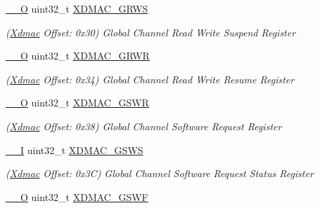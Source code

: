 \begin{DoxyCompactItemize}
\mbox{\hyperlink{core__cm7_8h_a7e25d9380f9ef903923964322e71f2f6}{\+\_\+\+\_\+O}} uint32\+\_\+t \mbox{\hyperlink{structXdmac_a5b9b148fbd65ee66068ffaac98f4cdfe}{X\+D\+M\+A\+C\+\_\+\+G\+R\+WS}}
\begin{DoxyCompactList}\small\item\em (\mbox{\hyperlink{structXdmac}{Xdmac}} Offset\+: 0x30) Global Channel Read Write Suspend Register \end{DoxyCompactList}\item 
\mbox{\label{structXdmac_ad80503154b04a9b85fa9e01dd39a9ffa}} 
\mbox{\hyperlink{core__cm7_8h_a7e25d9380f9ef903923964322e71f2f6}{\+\_\+\+\_\+O}} uint32\+\_\+t \mbox{\hyperlink{structXdmac_ad80503154b04a9b85fa9e01dd39a9ffa}{X\+D\+M\+A\+C\+\_\+\+G\+R\+WR}}
\begin{DoxyCompactList}\small\item\em (\mbox{\hyperlink{structXdmac}{Xdmac}} Offset\+: 0x34) Global Channel Read Write Resume Register \end{DoxyCompactList}\item 
\mbox{\label{structXdmac_ac0d8e32b993ed718d8e3374680318f3c}} 
\mbox{\hyperlink{core__cm7_8h_a7e25d9380f9ef903923964322e71f2f6}{\+\_\+\+\_\+O}} uint32\+\_\+t \mbox{\hyperlink{structXdmac_ac0d8e32b993ed718d8e3374680318f3c}{X\+D\+M\+A\+C\+\_\+\+G\+S\+WR}}
\begin{DoxyCompactList}\small\item\em (\mbox{\hyperlink{structXdmac}{Xdmac}} Offset\+: 0x38) Global Channel Software Request Register \end{DoxyCompactList}\item 
\mbox{\label{structXdmac_a367067a338bcf0b70ab601b93ac65810}} 
\mbox{\hyperlink{core__cm7_8h_af63697ed9952cc71e1225efe205f6cd3}{\+\_\+\+\_\+I}} uint32\+\_\+t \mbox{\hyperlink{structXdmac_a367067a338bcf0b70ab601b93ac65810}{X\+D\+M\+A\+C\+\_\+\+G\+S\+WS}}
\begin{DoxyCompactList}\small\item\em (\mbox{\hyperlink{structXdmac}{Xdmac}} Offset\+: 0x3C) Global Channel Software Request Status Register \end{DoxyCompactList}\item 
\mbox{\label{structXdmac_a1cfecf3e892a413632bb605a67bdc109}} 
\mbox{\hyperlink{core__cm7_8h_a7e25d9380f9ef903923964322e71f2f6}{\+\_\+\+\_\+O}} uint32\+\_\+t \mbox{\hyperlink{structXdmac_a1cfecf3e892a413632bb605a67bdc109}{X\+D\+M\+A\+C\+\_\+\+G\+S\+WF}}

\end{DoxyCompactItemize}
